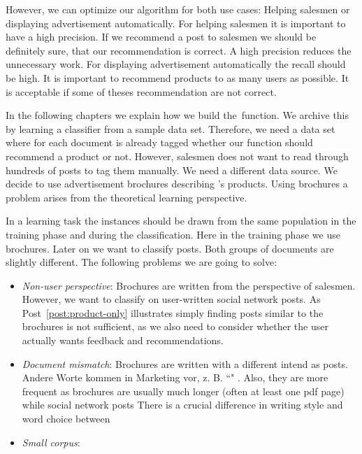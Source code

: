 However, we can optimize our algorithm for both use cases: Helping salesmen or displaying advertisement automatically.
For helping salesmen it is important to have a high precision. 
If we recommend a post to salesmen we should be definitely sure, that our recommendation is correct. 
A high precision reduces the unnecessary work.
For displaying advertisement automatically the recall should be high. 
It is important to recommend products to as many users as possible.
It is acceptable if some of theses recommendation are not correct.   

In the following chapters we explain how we build the~\nto function.
We archive this by learning a classifier from a sample data set. 
Therefore, we need a data set where for each document is already tagged whether our \nto function should recommend a product or not.
However, salesmen does not want to read through hundreds of posts to tag them manually.
We need a different data source.
We decide to use advertisement brochures describing \acme's products. 
Using brochures a problem arises from the theoretical learning perspective.

In a learning task the instances should be drawn from the same population in the training phase and during the classification.\nr
Here in the training phase we use brochures. Later on we want to classify posts. 
Both groups of documents are slightly different.
The following problems we are going to solve:

 \begin{itemize}
 	\item \emph{Non-user perspective}: Brochures are written from the perspective of salesmen. However, we want to classify on user-written social network posts.
 	As Post~\ref{post:product-only} illustrates simply finding posts similar to the brochures is not sufficient, as we also need to consider whether the user actually wants feedback and recommendations.
	\item \emph{Document mismatch}: Brochures are written with a different intend as posts. 
	Andere Worte kommen in Marketing vor, z. B. ``" . Also, they are more frequent as brochures are usually much longer (often at least one pdf page) while social network posts 
	There is a crucial difference in writing style and word choice between 
	\item \emph{Small corpus}: 
 \end{itemize}


